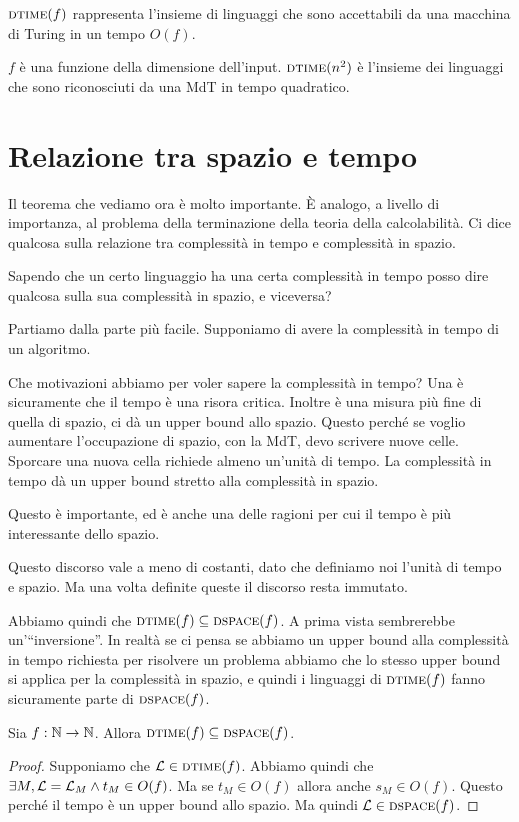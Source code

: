 $\textsc{dtime}(f)$ rappresenta l'insieme di linguaggi che sono accettabili da una macchina di Turing in un
tempo $O(f)$.

$f$ è una funzione della dimensione dell'input. $\textsc{dtime}(n^{2})$ è l'insieme dei linguaggi che sono
riconosciuti da una MdT in tempo quadratico.

\section{Relazione tra spazio e tempo}

Il teorema che vediamo ora è molto importante. È analogo, a livello di importanza, al problema
della terminazione della teoria della calcolabilità. Ci dice qualcosa sulla relazione tra
complessità in tempo e complessità in spazio.

Sapendo che un certo linguaggio ha una certa complessità in tempo posso dire qualcosa sulla sua
complessità in spazio, e viceversa?

Partiamo dalla parte più facile. Supponiamo di avere la complessità in tempo di un algoritmo.

Che motivazioni abbiamo per voler sapere la complessità in tempo? Una è sicuramente che il tempo
è una risora critica. Inoltre è una misura più fine di quella di spazio, ci dà un upper bound
allo spazio. Questo perché se voglio aumentare l'occupazione di spazio, con la MdT, devo scrivere
nuove celle. Sporcare una nuova cella richiede almeno un'unità di tempo. La complessità in tempo
dà un upper bound stretto alla complessità in spazio.

Questo è importante, ed è anche una delle ragioni per cui il tempo è più interessante dello
spazio.

Questo discorso vale a meno di costanti, dato che definiamo noi l'unità di tempo e spazio. Ma una
volta definite queste il discorso resta immutato.

Abbiamo quindi che $\textsc{dtime}(f) \subseteq \textsc{dspace}(f)$. A prima vista sembrerebbe un'``inversione''. In
realtà se ci pensa se abbiamo un upper bound alla complessità in tempo richiesta per risolvere un
problema abbiamo che lo stesso upper bound si applica per la complessità in spazio, e quindi i
linguaggi di $\textsc{dtime}(f)$ fanno sicuramente parte di $\textsc{dspace}(f)$.

\begin{thm}
    Sia $f: \mathbb{N} \to \mathbb{N}$. Allora $\textsc{dtime}(f) \subseteq \textsc{dspace}(f)$.
\end{thm}
\begin{proof}
    Supponiamo che $\mathcal{L} \in \textsc{dtime}(f)$. Abbiamo quindi che $\exists M, \mathcal{L} = \mathcal{L}_{M} \land
    t_{M} \in O(f)$. Ma se $t_{M} \in O(f)$ allora anche $s_{M} \in O(f)$. Questo perché il tempo
    è un upper bound allo spazio. Ma quindi $\mathcal{L} \in \textsc{dspace}(f)$.
\end{proof}

